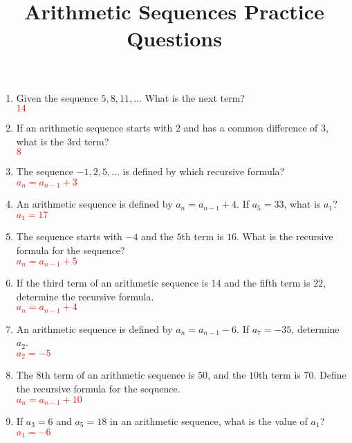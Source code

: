 \documentclass{article}
\begin{document}
\title{Arithmetic Sequences Practice Questions}
\author{}
\date{}
\maketitle

\begin{enumerate}[itemsep=2em] %
    \item Given the sequence $5, 8, 11, \ldots$ What is the next term? \\
    \textcolor{red}{$14$}
    
    \item If an arithmetic sequence starts with $2$ and has a common difference of $3$, what is the $3$rd term? \\
    \textcolor{red}{$8$}
    
    \item The sequence $-1, 2, 5, \ldots$ is defined by which recursive formula? \\
    \textcolor{red}{$a_n = a_{n-1} + 3$}
    
    \item An arithmetic sequence is defined by $a_n = a_{n-1} + 4$. If $a_5 = 33$, what is $a_1$? \\
    \textcolor{red}{$a_1 = 17$}
    
    \item The sequence starts with $-4$ and the $5$th term is $16$. What is the recursive formula for the sequence? \\
    \textcolor{red}{$a_n = a_{n-1} + 5$}
    
    \item If the third term of an arithmetic sequence is $14$ and the fifth term is $22$, determine the recursive formula. \\
    \textcolor{red}{$a_n = a_{n-1} + 4$}
    
    \item An arithmetic sequence is defined by $a_n = a_{n-1} - 6$. If $a_7 = -35$, determine $a_2$. \\
    \textcolor{red}{$a_2 = -5$}
    
    \item The $8$th term of an arithmetic sequence is $50$, and the $10$th term is $70$. Define the recursive formula for the sequence. \\
    \textcolor{red}{$a_n = a_{n-1} + 10$}
    
    \item If $a_3 = 6$ and $a_5 = 18$ in an arithmetic sequence, what is the value of $a_1$? \\
    \textcolor{red}{$a_1 = -6$}


\end{enumerate}
\end{document}
